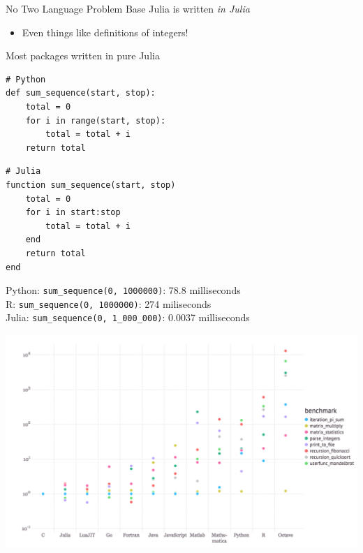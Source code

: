 \documentclass[11pt]{beamer}
\begin{document}
\begin{frame}[c]{No Two Language Problem}
Base Julia is written \emph{in Julia}
\begin{itemize}
    \item Even things like definitions of integers!
\end{itemize}
Most packages written in pure Julia
\end{frame}

\begin{frame}[fragile, t]{}
\begin{verbatim}
# Python
def sum_sequence(start, stop):
    total = 0
    for i in range(start, stop):
        total = total + i
    return total
\end{verbatim}
\begin{verbatim}
# Julia
function sum_sequence(start, stop)
    total = 0
    for i in start:stop
        total = total + i
    end
    return total
end
    \end{verbatim}
\pause
Python: \texttt{sum\_sequence(0, 1000000)}: 78.8 milliseconds\\
R: \texttt{sum\_sequence(0, 1000000)}: 274 miliseconds \\
Julia: \texttt{sum\_sequence(0, 1\_000\_000)}: 0.0037 milliseconds
\end{frame}

\begin{frame}[c]{}
    \includegraphics[width=\textwidth]{figures/benchmarks.png}
\end{frame}
\end{document}
